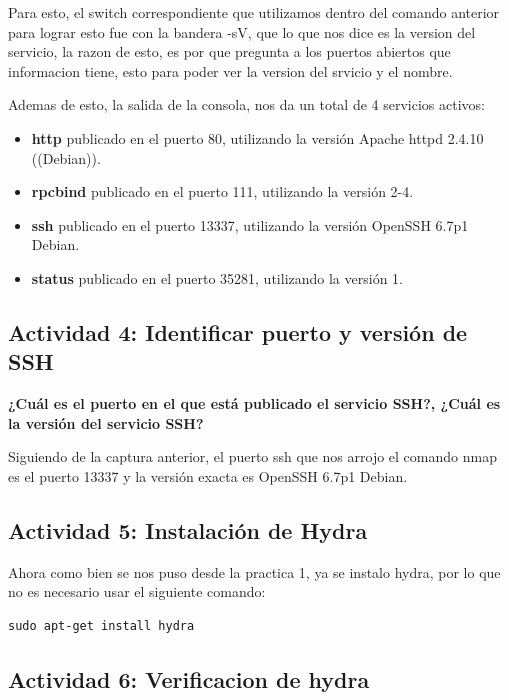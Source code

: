 \documentclass[letterpaper,11pt]{article}
\begin{document}
Para esto, el switch correspondiente que 
utilizamos dentro del comando anterior para lograr esto
fue con la bandera -sV, que lo que nos dice es la version del servicio, 
la razon de esto, es por que pregunta a los puertos 
abiertos que informacion tiene, esto para poder 
ver la version del srvicio y el nombre.

Ademas de esto, la salida de la consola, 
nos da un total de 4 servicios activos:

\begin{itemize}
    \item \textbf{http} publicado en el puerto 80, utilizando la versión Apache httpd 2.4.10 ((Debian)).
    \item \textbf{rpcbind} publicado en el puerto 111, utilizando la versión 2-4.
    \item \textbf{ssh} publicado en el puerto 13337, utilizando la versión OpenSSH 6.7p1 Debian.
    \item \textbf{status} publicado en el puerto 35281, utilizando la versión 1.
\end{itemize}


\subsection{Actividad 4: Identificar puerto y versión de SSH}

\textbf{¿Cuál es el puerto en el que está publicado el servicio SSH?, ¿Cuál es la versión del servicio SSH?}

Siguiendo de la captura anterior, 
el puerto ssh que nos arrojo el comando nmap es el puerto 13337 y la versión exacta es OpenSSH 6.7p1 Debian.

\subsection{Actividad 5: Instalación de Hydra}

Ahora como bien se nos puso desde la practica 1, ya se instalo hydra, por lo que 
no es necesario usar el siguiente comando:

\begin{lstlisting}[style=consolaSeguridad]
  sudo apt-get install hydra
\end{lstlisting}

\subsection{Actividad 6: Verificacion de hydra}
\end{document}
